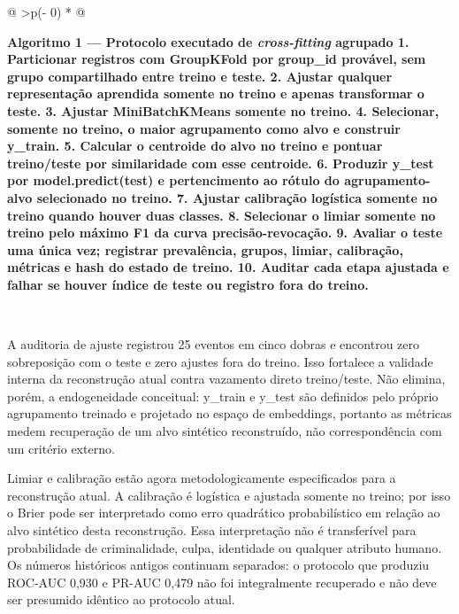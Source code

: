 \begingroup\SingleSpacing\fontsize{9.5}{11}\selectfont\setlength{\tabcolsep}{4pt}\renewcommand{\arraystretch}{1.25}\begin{longtable}[]{@{}
  >{\RaggedRight\arraybackslash}p{(\columnwidth - 0\tabcolsep) * }@{}}
\toprule\noalign{}
\begin{minipage}[b]{\linewidth}\raggedright
\textbf{Algoritmo 1 --- Protocolo executado de \emph{cross-fitting} agrupado 1. Particionar registros com GroupKFold por group\_id provável, sem grupo compartilhado entre treino e teste. 2. Ajustar qualquer representação aprendida somente no treino e apenas transformar o teste. 3. Ajustar MiniBatchKMeans somente no treino. 4. Selecionar, somente no treino, o maior agrupamento como alvo e construir y\_train. 5. Calcular o centroide do alvo no treino e pontuar treino/teste por similaridade com esse centroide. 6. Produzir y\_test por model.predict(test) e pertencimento ao rótulo do agrupamento-alvo selecionado no treino. 7. Ajustar calibração logística somente no treino quando houver duas classes. 8. Selecionar o limiar somente no treino pelo máximo F1 da curva precisão-revocação. 9. Avaliar o teste uma única vez; registrar prevalência, grupos, limiar, calibração, métricas e hash do estado de treino. 10. Auditar cada etapa ajustada e falhar se houver índice de teste ou registro fora do treino.}
\end{minipage} \\
\midrule\noalign{}
\endhead
\bottomrule\noalign{}
\endlastfoot
\end{longtable}\endgroup

A auditoria de ajuste registrou 25 eventos em cinco dobras e encontrou zero sobreposição com o teste e zero ajustes fora do treino. Isso fortalece a validade interna da reconstrução atual contra vazamento direto treino/teste. Não elimina, porém, a endogeneidade conceitual: y\_train e y\_test são definidos pelo próprio agrupamento treinado e projetado no espaço de embeddings, portanto as métricas medem recuperação de um alvo sintético reconstruído, não correspondência com um critério externo.

Limiar e calibração estão agora metodologicamente especificados para a reconstrução atual. A calibração é logística e ajustada somente no treino; por isso o Brier pode ser interpretado como erro quadrático probabilístico em relação ao alvo sintético desta reconstrução. Essa interpretação não é transferível para probabilidade de criminalidade, culpa, identidade ou qualquer atributo humano. Os números históricos antigos continuam separados: o protocolo que produziu ROC-AUC 0,930 e PR-AUC 0,479 não foi integralmente recuperado e não deve ser presumido idêntico ao protocolo atual.


